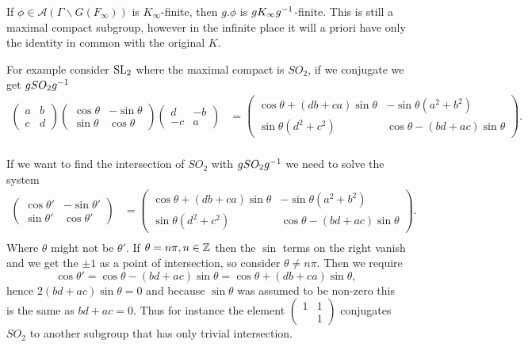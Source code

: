 \begin{example}
    If \(\phi\in \mathcal{A}(\Gamma \backslash G(F_\infty))\) is \(K_\infty\)-finite, then \(g.\phi\) is \(gK_\infty g^{-1}\)-finite. This is still a maximal compact subgroup, however in the infinite place it will a priori have only the identity in common with the original \(K\).

    For example consider \(\operatorname{SL}_2\) where the maximal compact is \(SO_2\), if we conjugate we get \(gSO_2g^{-1}\)
    \begin{align*}
        \begin{pmatrix}
            a & b\\
            c & d
        \end{pmatrix}
        \begin{pmatrix}
            \cos\theta & -\sin\theta \\
            \sin\theta & \cos\theta
        \end{pmatrix}
        \begin{pmatrix}
            d & -b\\
            -c & a
        \end{pmatrix}  &=  \begin{pmatrix}
            \cos\theta + (db  + ca)\sin\theta & -\sin\theta( a^2+b^2)\\
            \sin\theta(d^2 + c^2) & \cos\theta - (b d  + ac)\sin\theta
        \end{pmatrix}.\\
    \end{align*}

    If we want to find the intersection of \(SO_2\) with \(gSO_2 g^{-1}\) we need to solve the system 
    \begin{align*}
        \begin{pmatrix}
            \cos\theta' & -\sin\theta' \\
            \sin\theta' & \cos\theta'
        \end{pmatrix}  &=  \begin{pmatrix}
            \cos\theta + (db  + ca)\sin\theta & -\sin\theta( a^2+b^2)\\
            \sin\theta(d^2 + c^2) & \cos\theta - (b d  + ac)\sin\theta
        \end{pmatrix}.\\
    \end{align*}
    Where \(\theta\) might not be \(\theta'\). If \(\theta = n\pi, n\in \Z\) then the \(\sin\) terms on the right vanish and we get the \(\pm 1\) as a point of intersection, so consider \(\theta\neq n\pi\). Then we require 
    \[\cos\theta' = \cos\theta - (b d  + ac)\sin\theta = \cos\theta + (db  + ca)\sin\theta,\]
    hence \(2(bd+ac)\sin\theta = 0\) and because \(\sin\theta\) was assumed to be non-zero this is the same as \(bd+ac = 0\). Thus for instance the element \(\begin{pmatrix} 1 & 1\\ & 1  \end{pmatrix}\) conjugates \(SO_2\) to another subgroup that has only trivial intersection. 


\end{example}
